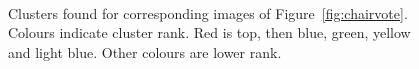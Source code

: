 \documentclass[11pt,a4paper]{kth-mag}
\begin{document}
\begin{figure}[H]
  \centering
  \\
  \caption{Clusters found for corresponding images of
    Figure~\ref{fig:chairvote}. Colours indicate cluster rank. Red is top, then
    blue, green, yellow and light blue. Other colours are lower rank.}
  \label{fig:chaircluster}
\end{figure}
\end{document}

